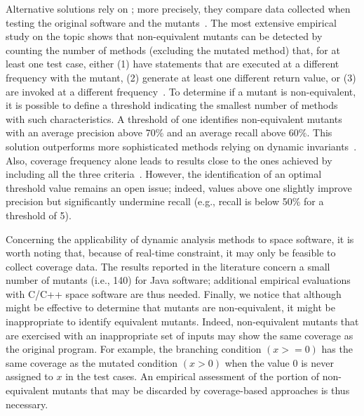 Alternative solutions rely on ; more precisely, they compare data collected when testing the original software and the mutants~\cite{grun2009impact,schuler2010covering,schuler2013covering,schuler2009efficient}.
The most extensive empirical study on the topic shows that non-equivalent mutants can be detected by counting the number of methods (excluding the mutated method) that, for at least one test case, either (1) have statements that are executed at a different frequency with the mutant, (2) generate at least one different return value, or (3) are invoked at a different frequency~\cite{schuler2013covering}. To determine if a mutant is non-equivalent, it is possible to define a threshold indicating the smallest number of methods with such characteristics. A threshold of one identifies non-equivalent mutants with an average precision above 70\% and an average recall above 60\%. This solution outperforms more sophisticated methods relying on dynamic invariants~\cite{schuler2009efficient}. Also, coverage frequency alone leads to results close to the ones achieved by including all the three criteria~\cite{schuler2013covering}.
However, the identification of an optimal threshold value remains an open issue; indeed, values above one slightly improve precision but significantly undermine recall (e.g., recall is below 50\% for a threshold of 5).

Concerning the applicability of dynamic analysis methods to space software, it is worth noting that, because of real-time constraint, it may only be feasible to collect coverage data.
The  results reported in the literature concern a small number of mutants (i.e., 140) for Java software;
additional empirical evaluations with C/C++ space software are thus needed.
Finally, we notice that although  might be effective to determine that mutants are non-equivalent, it might be inappropriate to identify equivalent mutants. Indeed,
non-equivalent mutants that are exercised with an inappropriate set of inputs may show the same coverage as the original program. For example, the branching condition $(x >= 0)$ has the same coverage as the mutated condition $(x > 0)$ when the value $0$ is never assigned to $x$ in the test cases.
An empirical assessment of the portion of non-equivalent mutants that may be discarded by coverage-based approaches is thus necessary.

